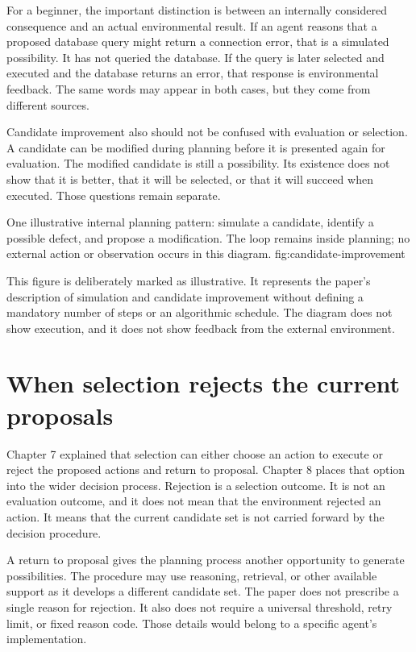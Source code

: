 For a beginner, the important distinction is between an internally considered consequence and an actual environmental result. If an agent reasons that a proposed database query might return a connection error, that is a simulated possibility. It has not queried the database. If the query is later selected and executed and the database returns an error, that response is environmental feedback. The same words may appear in both cases, but they come from different sources.

Candidate improvement also should not be confused with evaluation or selection. A candidate can be modified during planning before it is presented again for evaluation. The modified candidate is still a possibility. Its existence does not show that it is better, that it will be selected, or that it will succeed when executed. Those questions remain separate.

  {One illustrative internal planning pattern: simulate a candidate, identify a possible defect, and propose a modification. The loop remains inside planning; no external action or observation occurs in this diagram.}
  {fig:candidate-improvement}

This figure is deliberately marked as illustrative. It represents the paper's description of simulation and candidate improvement without defining a mandatory number of steps or an algorithmic schedule. The diagram does not show execution, and it does not show feedback from the external environment.

\section{When selection rejects the current proposals}
\label{sec:selection-rejection}

Chapter 7 explained that selection can either choose an action to execute or reject the proposed actions and return to proposal. Chapter 8 places that option into the wider decision process. Rejection is a selection outcome. It is not an evaluation outcome, and it does not mean that the environment rejected an action. It means that the current candidate set is not carried forward by the decision procedure.

A return to proposal gives the planning process another opportunity to generate possibilities. The procedure may use reasoning, retrieval, or other available support as it develops a different candidate set. The paper does not prescribe a single reason for rejection. It also does not require a universal threshold, retry limit, or fixed reason code. Those details would belong to a specific agent's implementation.

